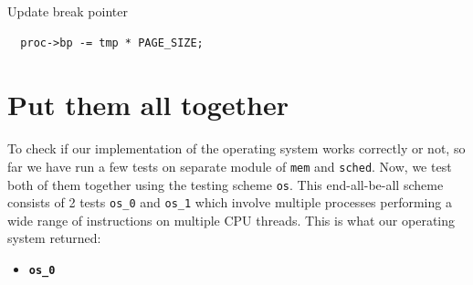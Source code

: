\documentclass[a4paper]{article}
\numberwithin{equation}{section}
\begin{document}
\begin{steps}
  \item Update break pointer
  \begin{mdframed}[leftline=false,rightline=false,backgroundcolor=magenta!10,nobreak=false]
    \begin{verbatim}
  proc->bp -= tmp * PAGE_SIZE;
    \end{verbatim}
  \end{mdframed}
\end{steps}

\section{Put them all together}
To check if our implementation of the operating system works correctly or not, so far we have run a few tests on separate module of \texttt{mem} and \texttt{sched}.
Now, we test both of them together using the testing scheme \texttt{os}.
This end-all-be-all scheme consists of 2 tests \texttt{os_0} and \texttt{os_1} which involve multiple processes performing a wide range of instructions on multiple CPU threads.
This is what our operating system returned:

\begin{itemize}
  \item \textbf{\texttt{os_0}}
\end{itemize}
\end{document}
